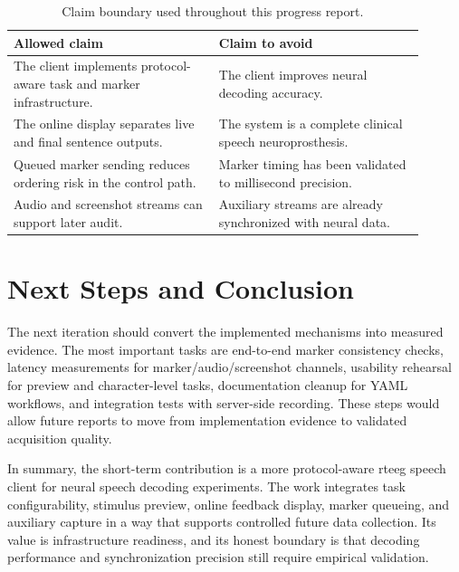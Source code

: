 \documentclass[11pt]{article}
\begin{document}
\begin{table}[t]
\centering
\small
\begin{tabular}{p{0.45\linewidth}p{0.45\linewidth}}
\toprule
Allowed claim & Claim to avoid \\
\midrule
The client implements protocol-aware task and marker infrastructure. & The client improves neural decoding accuracy. \\
The online display separates live and final sentence outputs. & The system is a complete clinical speech neuroprosthesis. \\
Queued marker sending reduces ordering risk in the control path. & Marker timing has been validated to millisecond precision. \\
Audio and screenshot streams can support later audit. & Auxiliary streams are already synchronized with neural data. \\
\bottomrule
\end{tabular}
\caption{Claim boundary used throughout this progress report.}
\end{table}

\section{Next Steps and Conclusion}
The next iteration should convert the implemented mechanisms into measured evidence. The most important tasks are end-to-end marker consistency checks, latency measurements for marker/audio/screenshot channels, usability rehearsal for preview and character-level tasks, documentation cleanup for YAML workflows, and integration tests with server-side recording. These steps would allow future reports to move from implementation evidence to validated acquisition quality.

In summary, the short-term contribution is a more protocol-aware rteeg speech client for neural speech decoding experiments. The work integrates task configurability, stimulus preview, online feedback display, marker queueing, and auxiliary capture in a way that supports controlled future data collection. Its value is infrastructure readiness, and its honest boundary is that decoding performance and synchronization precision still require empirical validation.



\end{document}
